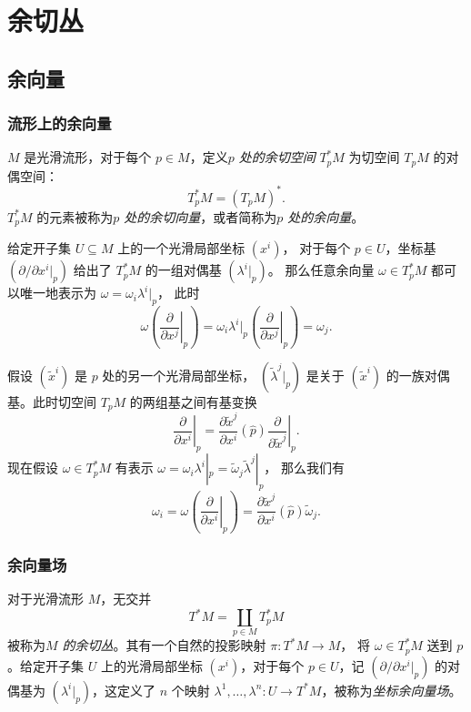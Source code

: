 

\chapter{余切丛}

\section{余向量}

\subsection{流形上的余向量}

$M$ 是光滑流形，对于每个 $p\in M$，定义\emph{$p$ 处的余切空间}
$T_p^*M$ 为切空间 $T_pM$ 的对偶空间：
\[
  T_p^*M=(T_pM)^*.  
\]
$T_p^*M$ 的元素被称为\emph{$p$ 处的余切向量}，或者简称为\emph{$p$ 处的余向量}。

给定开子集 $U\subseteq M$ 上的一个光滑局部坐标 $\left(x^i\right)$，
对于每个 $p\in U$，坐标基 $\left(\partial /\partial x^i|_p\right)$
给出了 $T_p^*M$ 的一组对偶基 $\left(\lambda^i|_p\right)$。
那么任意余向量 $\omega\in T_p^*M$ 都可以唯一地表示为 $\omega=\omega_i\lambda^i|_p$，
此时
\[
  \omega\left(\left.\frac{\partial}{\partial x^j}\right|_p\right)=\omega_i  
  \lambda^i|_p\left(\left.\frac{\partial}{\partial x^j}\right|_p\right)
  =\omega_j.
\]

假设 $\left(\tilde{x}^i\right)$ 是 $p$ 处的另一个光滑局部坐标，
$\left(\tilde{\lambda}^j|_p\right)$ 是关于 $\left(\tilde{x}^i\right)$
的一族对偶基。此时切空间 $T_pM$ 的两组基之间有基变换
\[
  \left.\frac{\partial}{\partial x^i}\right|_p=
  \frac{\partial\tilde x^j}{\partial x^i}(\hat p)
  \left.\frac{\partial}{\partial \tilde x^j}\right|_p.
\]
现在假设 $\omega\in T_p^*M$ 有表示 
$\omega=\omega_i\lambda^i|_p=\tilde{\omega}_j\tilde{\lambda}^j|_p$，
那么我们有
\[
  \omega_i=\omega\left(
    \left.\frac{\partial}{\partial x^i}\right|_p
  \right)=
  \frac{\partial\tilde x^j}{\partial x^i}(\hat p)
  \tilde{\omega}_j.
\]


\subsection{余向量场}

对于光滑流形 $M$，无交并
\[
  T^*M=\coprod_{p\in M}T_p^*M  
\]
被称为\emph{$M$ 的余切丛}。其有一个自然的投影映射 $\pi:T^*M\to M$，
将 $\omega\in T_p^*M$ 送到 $p$。给定开子集 $U$ 上的光滑局部坐标
$\left(x^i\right)$，对于每个 $p\in U$，记 $\left(\partial/\partial x^i|_p\right)$
的对偶基为 $\left(\lambda^i|_p\right)$，这定义了 $n$ 个映射
$\lambda^1,\dots,\lambda^n:U\to T^*M$，被称为\emph{坐标余向量场}。

